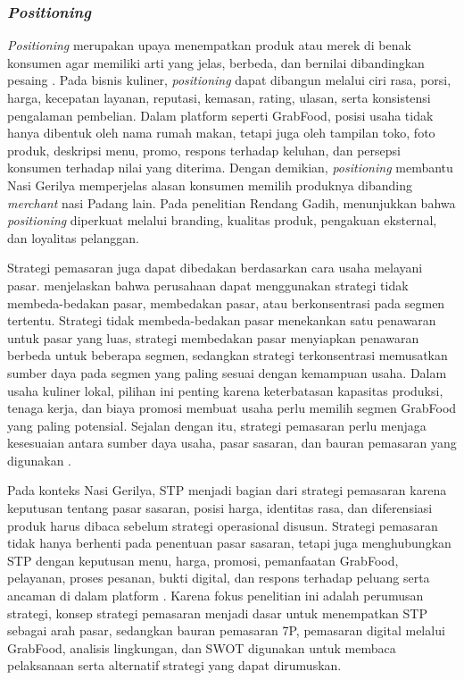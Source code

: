 \subsubsection{\textit{Positioning}}
\textit{Positioning} merupakan upaya menempatkan produk atau merek di benak konsumen agar memiliki arti yang jelas, berbeda, dan bernilai dibandingkan pesaing \parencite{kotler2023principlesmarketing}. Pada bisnis kuliner, \textit{positioning} dapat dibangun melalui ciri rasa, porsi, harga, kecepatan layanan, reputasi, kemasan, rating, ulasan, serta konsistensi pengalaman pembelian. Dalam platform seperti GrabFood, posisi usaha tidak hanya dibentuk oleh nama rumah makan, tetapi juga oleh tampilan toko, foto produk, deskripsi menu, promo, respons terhadap keluhan, dan persepsi konsumen terhadap nilai yang diterima. Dengan demikian, \textit{positioning} membantu Nasi Gerilya memperjelas alasan konsumen memilih produknya dibanding \textit{merchant} nasi Padang lain. Pada penelitian Rendang Gadih, \textcite{sophia2025rendanggadih} menunjukkan bahwa \textit{positioning} diperkuat melalui branding, kualitas produk, pengakuan eksternal, dan loyalitas pelanggan.


\resetindent
Strategi pemasaran juga dapat dibedakan berdasarkan cara usaha melayani pasar. \textcite{assauri2017manajemenpemasaran} menjelaskan bahwa perusahaan dapat menggunakan strategi tidak membeda-bedakan pasar, membedakan pasar, atau berkonsentrasi pada segmen tertentu. Strategi tidak membeda-bedakan pasar menekankan satu penawaran untuk pasar yang luas, strategi membedakan pasar menyiapkan penawaran berbeda untuk beberapa segmen, sedangkan strategi terkonsentrasi memusatkan sumber daya pada segmen yang paling sesuai dengan kemampuan usaha. Dalam usaha kuliner lokal, pilihan ini penting karena keterbatasan kapasitas produksi, tenaga kerja, dan biaya promosi membuat usaha perlu memilih segmen GrabFood yang paling potensial. Sejalan dengan itu, strategi pemasaran perlu menjaga kesesuaian antara sumber daya usaha, pasar sasaran, dan bauran pemasaran yang digunakan \parencite{machfoedz2005pengantarpemasaranmodern}.

Pada konteks Nasi Gerilya, STP menjadi bagian dari strategi pemasaran karena keputusan tentang pasar sasaran, posisi harga, identitas rasa, dan diferensiasi produk harus dibaca sebelum strategi operasional disusun. Strategi pemasaran tidak hanya berhenti pada penentuan pasar sasaran, tetapi juga menghubungkan STP dengan keputusan menu, harga, promosi, pemanfaatan GrabFood, pelayanan, proses pesanan, bukti digital, dan respons terhadap peluang serta ancaman di dalam platform \parencite{kotler2023principlesmarketing,chaffey2022digitalmarketing,david2023strategicmanagement}. Karena fokus penelitian ini adalah perumusan strategi, konsep strategi pemasaran menjadi dasar untuk menempatkan STP sebagai arah pasar, sedangkan bauran pemasaran 7P, pemasaran digital melalui GrabFood, analisis lingkungan, dan SWOT digunakan untuk membaca pelaksanaan serta alternatif strategi yang dapat dirumuskan.

